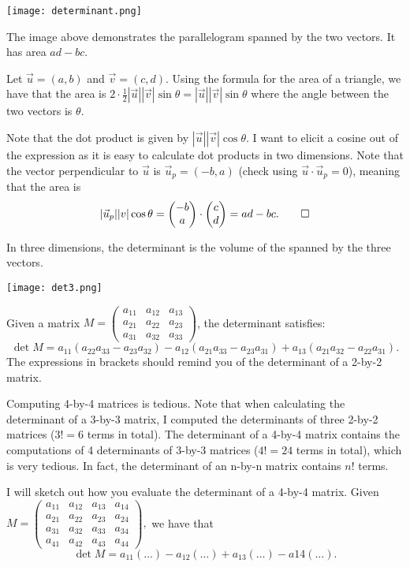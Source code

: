 \documentclass[a4paper, 12pt,oneside,openany]{book}
\begin{document}
\texttt{[image: determinant.png]}

The image above demonstrates the parallelogram spanned by the two vectors. It has area $ad-bc$. 

 Let $\vec{u} = (a, b)$ and $\vec{v} = (c, d)$. Using the formula for the area of a triangle, we have that the area is $2 \cdot \frac{1}{2}|\vec{u}||\vec{v}| \sin \theta=|\vec{u}||\vec{v}| \sin \theta$ where the angle between the two vectors is $\theta$. 

Note that the dot product is given by $|\vec{u}||\vec{v}| \cos \theta$. I want to elicit a cosine out of the expression as it is easy to calculate dot products in two dimensions. Note that the vector perpendicular to $\vec{u}$ is $\vec{u}_p = (-b, a)$ (check using $\vec{u} \cdot \vec{u}_p =0$), meaning that the area is $$|\vec{u}_p||v|\cos\theta = \begin{pmatrix}-b \\ a \end{pmatrix} \cdot \begin{pmatrix}c \\ d \end{pmatrix}=ad-bc. \qed$$ 

In three dimensions, the determinant is the volume of the  spanned by the three vectors. 

\texttt{[image: det3.png]}

Given a matrix $M= \begin{pmatrix} a_{11} & a_{12} & a_{13} \\ a_{21} & a_{22} & a_{23} \\ a_{31} & a_{32} & a_{33} \end{pmatrix}$, the determinant satisfies: $$\det{M} = a_{11} (a_{22}a_{33}-a_{23}a_{32}) - a_{12}(a_{21}a_{33}-a_{23}a_{31}) + a_{13}(a_{21}a_{32}-a_{22}a_{31}).$$ The expressions in brackets should remind you of the determinant of a 2-by-2 matrix.

Computing 4-by-4 matrices is tedious. Note that when calculating the determinant of a 3-by-3 matrix, I computed the determinants of three 2-by-2 matrices ($3!=6$ terms in total). The determinant of a 4-by-4 matrix contains the computations of 4 determinants of 3-by-3 matrices ($4! = 24$ terms in total), which is very tedious. In fact, the determinant of an n-by-n matrix contains $n!$ terms.

I will sketch out how you evaluate the determinant of a 4-by-4 matrix. Given $M= \begin{pmatrix} a_{11} & a_{12} & a_{13} & a_{14} \\ a_{21} & a_{22} & a_{23} & a_{24} \\ a_{31} & a_{32} & a_{33} & a_{34} \\ a_{41} & a_{42} & a_{43} & a_{44}\end{pmatrix},$ we have that $$\det{M} = a_{11} (\dots) - a_{12} (\dots) + a_{13} (\dots) - a{14}(\dots).$$
\end{document}

